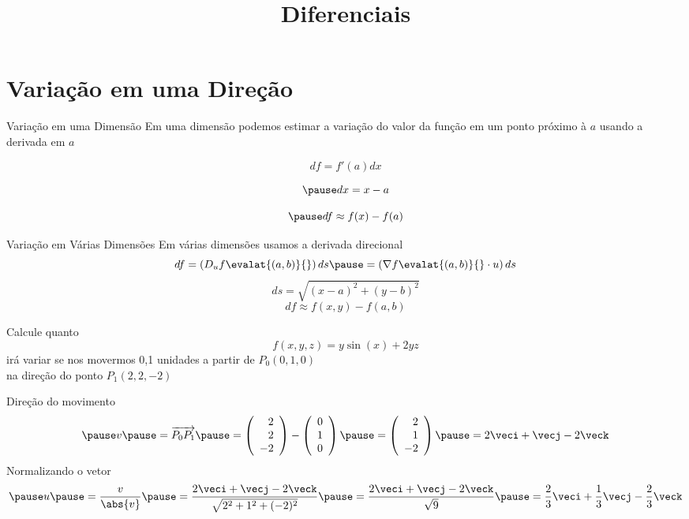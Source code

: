 \documentclass[fleqn,utf8,aspectratio=169,12pt]{beamer}
\title{Diferenciais}
\begin{document}
\addtitle

\section{Variação em uma Direção}

\begin{frame}{Variação em uma Dimensão}
  Em uma dimensão podemos estimar a variação do valor da função em um ponto próximo à $a$
  usando a derivada em $a$

  \pause
  \[
    df = f'(a) dx
  \]

  \[
    \pause
    dx = x - a
  \]

  \[
    \pause
    df \approx f(x) - f(a)
  \]
\end{frame}

\begin{frame}{Variação em Várias Dimensões}
  Em várias dimensões usamos a derivada direcional
  \pause
  \[
    df
    = \left(D_u f\evalat{(a, b)}{}\right) ds
    \pause
    = \left(\nabla f\evalat{(a, b)}{} \cdot u\right) ds
  \]
  \pause
  \[
    ds = \sqrt{(x - a)^2 + (y-b)^2}
  \]
  \pause
  \[
    df \approx f(x, y) - f(a, b)
  \]
\end{frame}

\begin{question}
  Calcule quanto
  \[
    f(x, y, z) = y\sin(x) + 2yz
  \]
  irá variar se nos movermos 0,1 unidades a partir de \(P_0(0, 1, 0)\) \\
  na direção do ponto \(P_1(2, 2, -2)\)
\end{question}

\begin{resolution}{Direção do movimento}
  \[
    \pause
    v
    \pause
    = \overrightarrow{P_0P_1}
    \pause
    = \left(\begin{array}{r} 2 \\ 2 \\ -2 \end{array}\right)
    - \left(\begin{array}{r} 0 \\ 1 \\  0 \end{array}\right)
    \pause
    = \left(\begin{array}{r} 2 \\ 1 \\  -2 \end{array}\right)
    \pause
    = 2\veci + \vecj -2\veck
  \]
  \pause
  Normalizando o vetor
  \[
    \pause
    u
    \pause
    = \frac{v}{\abs{v}}
    \pause
    = \frac{2\veci + \vecj -2\veck}{\sqrt{2^2 + 1^2 + (-2)^2}}
    \pause
    = \frac{2\veci + \vecj -2\veck}{\sqrt{9}}
    \pause
    = \frac{2}{3} \veci + \frac{1}{3} \vecj - \frac{2}{3} \veck
  \]
\end{resolution}
\end{document}
